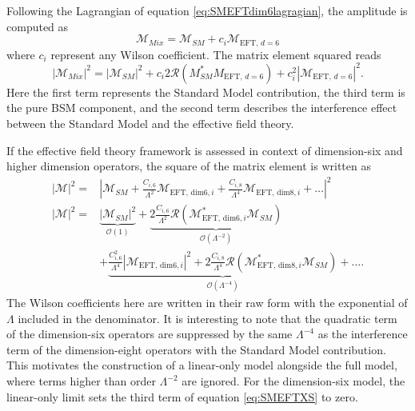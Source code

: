 Following the Lagrangian of equation \ref{eq:SMEFTdim6lagragian}, the amplitude is computed as
\begin{equation}
\mathcal M_{Mix} = \mathcal M_{SM} + c_i \mathcal M_{\text{EFT, }d=6}
\end{equation}
where $c_i$ represent any Wilson coefficient. The matrix element squared reads
\begin{equation}\label{eq:EFTamplitude}
 \left | \mathcal  M_{Mix} \right |^2  = 
\left |  \mathcal M_{SM} \right |^2 +
c_i 2 \mathcal R \left ( M_{SM}^{*} M_{\text{EFT, }d=6} \right) +
c_i^2  \left |  \mathcal M_{\text{EFT, }d=6} \right |^2. 
\end{equation}
Here the first term represents the Standard Model contribution, the third term is the pure BSM component, and the second term describes the interference effect between the Standard Model and the effective field theory. 

If the effective field theory framework is assessed in context of dimension-six and higher dimension operators, the square of the matrix element is written as 
\begin{equation}
  \begin{aligned}
  \left|\mathcal M\right|^2 =& \left| \mathcal M_{SM} + \frac{C_{i,6}}{\Lambda^{2}} \mathcal M_{\text{EFT, dim6},i}  + \frac{C_{i,8}}{\Lambda^{4}} \mathcal M_{\text{EFT, dim8},i} + \ldots \right|^2 \\
  \left|\mathcal M\right|^2 =& \underbrace{\left|\mathcal M_{SM}\right|^2}_{\mathcal{O}(1)} +  
  \underbrace{2 \frac{C_{i,6}}{\Lambda^{2}} \mathcal{R} \left(\mathcal M_{\text{EFT, dim6},i}^{\ast} \mathcal M_{SM} \right)}_{\mathcal{O}(\Lambda^{-2})}   \\ 
  &  + \underbrace{
      \frac{C_{i,6}^2}{\Lambda^{4}} \left| \mathcal M_{\text{EFT, dim6},i} \right|^2
      + 2 \frac{C_{i,8}}{\Lambda^{4}} \mathcal{R} \left(\mathcal M_{\text{EFT, dim8},i}^{\ast} \mathcal M_{SM} \right)
    }_{\mathcal{O}(\Lambda^{-4})} +  \ldots . 
  \end{aligned}
\end{equation}
The Wilson coefficients here are written in their raw form with the exponential of $\Lambda$ included in the denominator. It is interesting to note that the quadratic term of the dimension-six operators are suppressed by the same $\Lambda^{-4}$ as the interference term of the dimension-eight operators with the Standard Model contribution. This motivates the construction of a linear-only model alongside the full model, where terms higher than order $\Lambda^{-2}$ are ignored. For the dimension-six model, the linear-only limit sets the third term of equation \ref{eq:SMEFTXS} to zero. 

